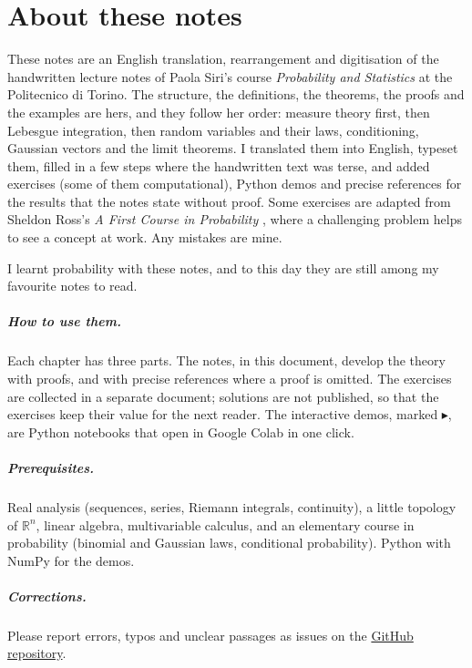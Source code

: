 \chapter*{About these notes}

These notes are an English translation, rearrangement and digitisation of the handwritten
lecture notes of Paola Siri's course \emph{Probability and Statistics} at the Politecnico di
Torino.\nocite{siri-notes} The structure,
the definitions, the theorems, the proofs and the examples are hers, and they follow her order:
measure theory first, then Lebesgue integration, then random variables and their laws,
conditioning, Gaussian vectors and the limit theorems. I translated them into English, typeset
them, filled in a few steps where the handwritten text was terse, and added exercises (some of
them computational), Python demos and precise references for the results that the notes state
without proof. Some exercises are adapted from Sheldon Ross's \emph{A First Course in
Probability} \citep{ross-5}, where a challenging problem helps to see a concept at work. Any
mistakes are mine.

I learnt probability with these notes, and to this day they are still among my favourite notes
to read.

\paragraph{How to use them.} Each chapter has three parts. The notes, in this document,
develop the theory with proofs, and with precise references where a proof is omitted. The
exercises are collected in a separate document; solutions are not published, so that the
exercises keep their value for the next reader. The interactive demos, marked
\textcolor{cobalt}{$\blacktriangleright$}, are Python notebooks that open in Google Colab in one
click.

\paragraph{Prerequisites.} Real analysis (sequences, series, Riemann integrals, continuity),
a little topology of $\mathbb R^n$, linear algebra, multivariable calculus, and an elementary
course in probability (binomial and Gaussian laws, conditional probability). Python with NumPy
for the demos.

\paragraph{Corrections.} Please report errors, typos and unclear passages as issues on
the \href{\repourl/issues}{GitHub repository}.

